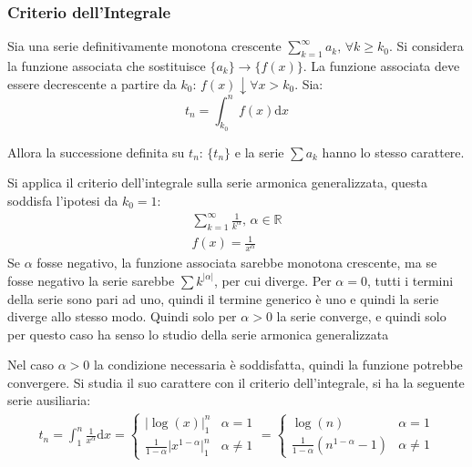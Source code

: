 \documentclass{article}
\numberwithin{equation}{subsection}
\begin{document}
\subsubsection{Criterio dell'Integrale}
Sia una serie definitivamente monotona crescente $\sum_{k=1}^\infty a_k,\,\forall k\geq k_0$. 
Si considera la funzione associata che sostituisce $\{a_k\}\rightarrow\{f(x)\}$. La funzione associata deve essere decrescente a partire da $k_0$: $f(x)\downarrow \forall x>k_0$. Sia:
\begin{equation*}
    t_n=\displaystyle\int_{k_0}^n f(x)\mathrm{d}x
\end{equation*}

Allora la successione definita su $t_n$: $\{t_n\}$ e la serie $\sum a_k$ hanno lo stesso carattere. 

Si applica il criterio dell'integrale sulla serie armonica generalizzata, questa soddisfa l'ipotesi da $k_0=1$:
\begin{gather*}
    \displaystyle\sum_{k=1}^\infty\frac{1}{k^\alpha},\,\alpha\in\mathbb{R}\\
    f(x)=\displaystyle\frac{1}{x^\alpha}
\end{gather*}
Se $\alpha$ fosse negativo, la funzione associata sarebbe monotona crescente, ma se fosse negativo la serie sarebbe $\sum k^{|\alpha|}$, per cui diverge. 
Per $\alpha=0$, tutti i termini della serie sono pari ad uno, quindi il termine generico è uno e quindi la serie diverge allo stesso modo. Quindi solo per $\alpha>0$ la serie converge, e quindi solo per questo caso ha senso lo studio della serie armonica generalizzata

Nel caso $\alpha>0$ la condizione necessaria è soddisfatta, quindi la funzione potrebbe convergere. Si studia il suo carattere con il criterio dell'integrale, si ha la seguente serie ausiliaria:
\begin{gather*}
    t_n=\displaystyle\int_{1}^n\frac{1}{x^\alpha}\mathrm{d}x=\begin{cases}
        \bigg|\log(x)\bigg|_1^n &\alpha=1\\
        \displaystyle\frac{1}{1-\alpha}\bigg|x^{1-\alpha}\bigg|_1^n&\alpha\neq1
    \end{cases}=\begin{cases}
        \log(n)&\alpha=1\\
        \displaystyle\frac{1}{1-\alpha}\left(n^{1-\alpha}-1\right)&\alpha\neq1
    \end{cases}
\end{gather*}
\end{document}
